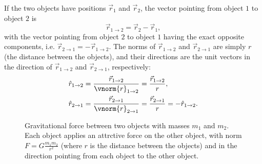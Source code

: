 If the two objects have positions $\vec{r}_{1}$ and $\vec{r}_{2}$, the vector pointing from object $1$ to object $2$ is
\begin{equation}
  \vec{r}_{1\to2} = \vec{r}_{2} - \vec{r}_{1},
  \label{eq:position_vector}
\end{equation}
with the vector pointing from object $2$ to object $1$ having the exact opposite components, i.e. $\vec{r}_{2\to1}=-\vec{r}_{1\to2}$. The norms of $\vec{r}_{1\to2}$ and $\vec{r}_{2\to1}$ are simply $r$ (the distance between the objects), and their directions are the unit vectors in the direction of $\vec{r}_{1\to2}$ and $\vec{r}_{2\to1}$, respectively:
\begin{align}
  \hat{r}_{1\to2} &= \frac{\vec{r}_{1\to2}}{\vnorm{r}_{1\to2}} = \frac{\vec{r}_{1\to2}}{r}\nonumber,\\
  \hat{r}_{2\to1} &= \frac{\vec{r}_{2\to1}}{\vnorm{r}_{2\to1}} = \frac{\vec{r}_{2\to1}}{r} = -\hat{r}_{1\to2}.
  \label{eq:normed_position_vector}
\end{align}

\begin{figure}
  \begin{center}
  \end{center}
  \caption{Gravitational force between two objects with masses $m_{1}$ and $m_{2}$. Each object applies an attrctive force on the other object, with norm $F=G\frac{m_{1}m_{2}}{r^{2}}$ (where $r$ is the distance between the objects) and in the direction pointing from each object to the other object.}
  \label{fig:gravity_basics}
\end{figure}

